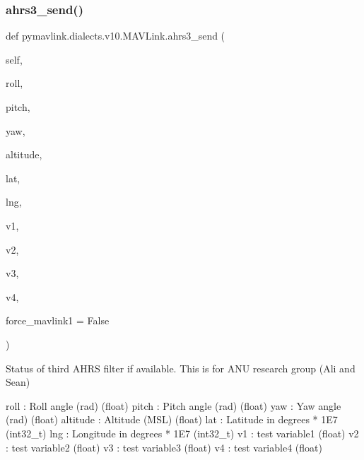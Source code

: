 \subsubsection{\texorpdfstring{ahrs3\+\_\+send()}{ahrs3\_send()}}
{\footnotesize\ttfamily def pymavlink.\+dialects.\+v10.\+M\+A\+V\+Link.\+ahrs3\+\_\+send (\begin{DoxyParamCaption}\item[{}]{self,  }\item[{}]{roll,  }\item[{}]{pitch,  }\item[{}]{yaw,  }\item[{}]{altitude,  }\item[{}]{lat,  }\item[{}]{lng,  }\item[{}]{v1,  }\item[{}]{v2,  }\item[{}]{v3,  }\item[{}]{v4,  }\item[{}]{force\+\_\+mavlink1 = {\ttfamily False} }\end{DoxyParamCaption})}

\begin{DoxyVerb}Status of third AHRS filter if available. This is for ANU research
group (Ali and Sean)

roll                      : Roll angle (rad) (float)
pitch                     : Pitch angle (rad) (float)
yaw                       : Yaw angle (rad) (float)
altitude                  : Altitude (MSL) (float)
lat                       : Latitude in degrees * 1E7 (int32_t)
lng                       : Longitude in degrees * 1E7 (int32_t)
v1                        : test variable1 (float)
v2                        : test variable2 (float)
v3                        : test variable3 (float)
v4                        : test variable4 (float)\end{DoxyVerb}
 \mbox{\label{classpymavlink_1_1dialects_1_1v10_1_1MAVLink_a6b4fd5e23415e3bf5eb53122dd4dfb95}} 
